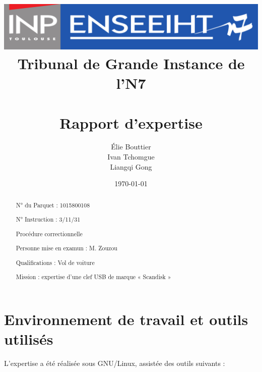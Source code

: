 \documentclass[a4paper,11pt]{article}
\title{\includegraphics{inp-enseeiht.png} \\ Tribunal de Grande Instance de l’N7 \\ ~ \\ Rapport d’expertise}
\author{Élie {\sc Bouttier}\\Ivan {\sc Tchomgue} \\ Liangqi {\sc Gong}}
\date\today
\begin{document}
\maketitle

\vspace{2cm}

\begin{abstract}
    N° du Parquet : 1015800108

    N° Instruction : 3/11/31

    Procédure correctionnelle

    Personne mise en examun : M. {\sc Zouzou}

    Qualifications : Vol de voiture

    Mission : expertise d'une clef USB de marque « Scandisk »
\end{abstract}

\vspace{2cm}

\tableofcontents

\newpage

\section{Environnement de travail et outils utilisés}

L’expertise a été réalisée sous GNU/Linux, assistée des outils suivants :
\end{document}
